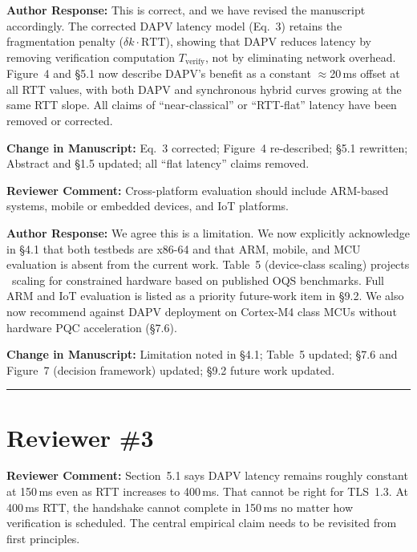 \documentclass[12pt]{article}
\newcommand{\RC}[1]{\textcolor{reviewerblue}{\textbf{Reviewer Comment:}} #1}
\newcommand{\AR}[1]{\textcolor{replygreen}{\textbf{Author Response:}} #1}
\newcommand{\CH}[1]{\textcolor{changemagenta}{\textbf{Change in Manuscript:}} #1}
\begin{document}
\begin{replybox}
\AR{This is correct, and we have revised the manuscript accordingly.
The corrected DAPV latency model (Eq.~3) retains the fragmentation
penalty ($\delta k \cdot \text{RTT}$), showing that DAPV reduces latency
by removing verification computation $T_{\text{verify}}$, not by eliminating
network overhead.  Figure~4 and \S5.1 now describe DAPV's benefit as a
constant $\approx$20\,ms offset at all RTT values, with both DAPV and
synchronous hybrid curves growing at the same RTT slope.  All claims of
``near-classical'' or ``RTT-flat'' latency have been removed or corrected.}

\CH{Eq.~3 corrected; Figure~4 re-described; \S5.1 rewritten; Abstract
and \S1.5 updated; all ``flat latency'' claims removed.}
\end{replybox}

\begin{reviewbox}
\RC{Cross-platform evaluation should include ARM-based systems, mobile or
embedded devices, and IoT platforms.}
\end{reviewbox}

\begin{replybox}
\AR{We agree this is a limitation.  We now explicitly acknowledge in \S4.1
that both testbeds are x86-64 and that ARM, mobile, and MCU evaluation
is absent from the current work.  Table~5 (device-class scaling) projects
\Dt\ scaling for constrained hardware based on published OQS benchmarks.
Full ARM and IoT evaluation is listed as a priority future-work item in
\S9.2.  We also now recommend against DAPV deployment on Cortex-M4 class
MCUs without hardware PQC acceleration (\S7.6).}

\CH{Limitation noted in \S4.1; Table~5 updated; \S7.6 and Figure~7
(decision framework) updated; \S9.2 future work updated.}
\end{replybox}

\vspace{1em}
\hrule
\vspace{1em}

\section*{Reviewer \#3}

\begin{reviewbox}
\RC{Section~5.1 says DAPV latency remains roughly constant at 150\,ms even as
RTT increases to 400\,ms.  That cannot be right for TLS~1.3.  At 400\,ms RTT,
the handshake cannot complete in 150\,ms no matter how verification is
scheduled.  The central empirical claim needs to be revisited from first
principles.}
\end{reviewbox}
\end{document}
